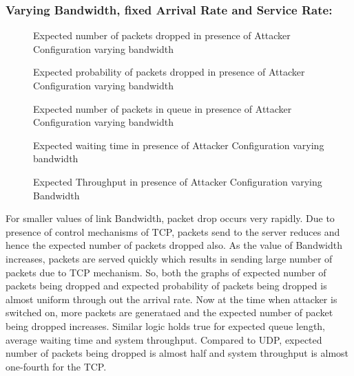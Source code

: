 \pagebreak

\subsubsection*{Varying Bandwidth, fixed Arrival Rate and Service Rate:}

\begin{figure}[H]
		\centering
		\caption{{Expected number of packets dropped in presence of Attacker Configuration varying bandwidth}}
		\label{fig:figdb1}
\end{figure}

\begin{figure}[H]
		\centering
		\caption{{Expected probability of packets dropped in presence of Attacker Configuration varying bandwidth}}
		\label{fig:figdc1}
\end{figure}

\begin{figure}[H]
		\centering
		\caption{{Expected number of packets in queue in presence of Attacker Configuration varying bandwidth}}
		\label{fig:figdd1}
\end{figure}


\begin{figure}[H]
		\centering
		\caption{{Expected waiting time in presence of Attacker Configuration varying bandwidth}}
		\label{fig:figde1}
\end{figure}

\begin{figure}[H]
		\centering
		\caption{{Expected Throughput in presence of Attacker Configuration varying Bandwidth}}
		\label{fig:figdf1}
\end{figure}

For smaller values of link Bandwidth, packet drop occurs very rapidly. Due to presence of control mechanisms of TCP, packets send to the server reduces and hence the expected number of packets dropped also. As the value of Bandwidth increases, packets are served quickly which results in sending large number of packets due to TCP mechanism. So, both the graphs of expected number of packets being dropped and expected probability of packets being dropped is almost uniform through out the arrival rate. Now at the time when attacker is switched on, more packets are generataed and the expected number of packet being dropped increases. Similar logic holds true for expected queue length, average waiting time and system throughput. Compared to UDP, expected number of packets being dropped is almost half and system throughput is almost one-fourth for the TCP.
\pagebreak

